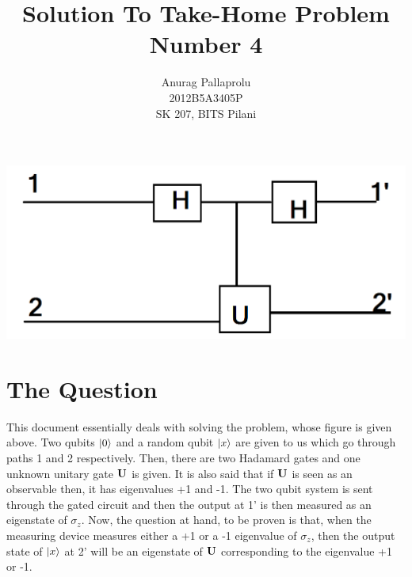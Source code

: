 


\usepackage{graphicx}


\title{Solution To Take-Home Problem Number 4}
\author{Anurag Pallaprolu\\2012B5A3405P\\SK 207, BITS Pilani}
\maketitle


\includegraphics[scale=0.5]{imgsrc.png}
\section{The Question}
This document essentially deals with solving the problem, whose figure is given above. Two qubits $\left| 0 \right>$ and a random qubit $\left| x \right>$ are given to us which go through paths 1 and 2 respectively. Then, there are two Hadamard gates and one unknown unitary gate $\mathbf{U}$ is given. It is also said that if $\mathbf{U}$ is seen as an observable then, it has eigenvalues +1 and -1.  The two qubit system is sent through the gated circuit and then the output at 1' is then measured as an eigenstate of $\sigma_{z}$. Now, the question at hand, to be proven is that, when the measuring device measures either a +1 or a -1 eigenvalue of  $\sigma_{z}$, then the output state of $\left| x \right>$ at 2' will be an eigenstate of $\mathbf{U}$ corresponding to the eigenvalue +1 or -1.
